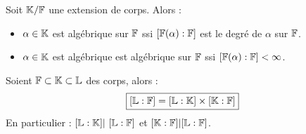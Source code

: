 \begin{prop}
    Soit $ \mathbb{K} / \mathbb{F}$ une extension de corps. Alors : 
    \begin{itemize}
        \item $ \alpha \in \mathbb{K}$ est algébrique sur $\mathbb{F}$ ssi $[\mathbb{F}(\alpha) : \mathbb{F}]$ est le degré 
        de $\alpha$ sur $\mathbb{F}$. 
        \item $\alpha \in \mathbb{K}$ est algébrique est algébrique sur $\mathbb{F}$ ssi $[\mathbb{F}(\alpha) : \mathbb{F}] < \infty$. 
    \end{itemize}
\end{prop}

\begin{theorem}
    Soient $\mathbb{F} \subset \mathbb{K} \subset \mathbb{L}$ des corps, alors : 
        \[ \boxed{ [\mathbb{L} : \mathbb{F}] = [\mathbb{L} : \mathbb{K}] \times [\mathbb{K} : \mathbb{F}] } \] 
    En particulier : $[\Lc : \K] | [\Lc : \Fc]$ et $ [\mathbb{K} : \mathbb{F}] | [\mathbb{L} : \mathbb{F}]$. 
\end{theorem}






